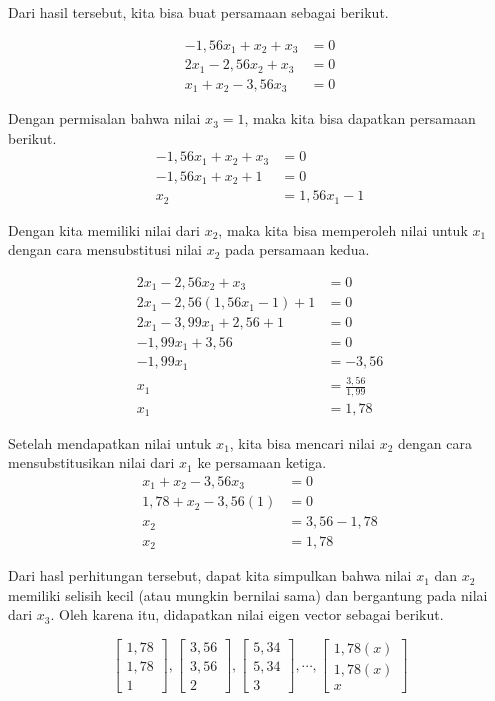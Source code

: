 \documentclass{article}
\begin{document}
\setcounter{equation}{0}

Dari hasil tersebut, kita bisa buat persamaan sebagai berikut.

\begin{align}
    -1,56x_1 + x_2 + x_3 &= 0\\
    2x_1 -2,56x_2 + x_3 &= 0\\
    x_1 + x_2 -3,56x_3 &= 0
\end{align}

Dengan permisalan bahwa nilai $x_3 = 1$, maka kita bisa dapatkan persamaan berikut.
\begin{align*}
-1,56x_1 + x_2 + x_3 &= 0\\
    -1,56x_1 + x_2 + 1 &= 0\\
    x_2 &= 1,56x_1 - 1
\end{align*}

Dengan kita memiliki nilai dari $x_2$, maka kita bisa memperoleh nilai untuk $x_1$ dengan cara mensubstitusi nilai $x_2$ pada persamaan kedua.

\begin{align*}
    2x_1 -2,56x_2 + x_3 &= 0\\
    2x_1 -2,56(1,56x_1 - 1) + 1 &= 0\\
    2x_1 -3,99x_1 + 2,56 + 1 &= 0\\
    -1,99x_1 + 3,56&= 0\\
    -1,99x_1 &= -3,56\\
    x_1 &= \frac{3,56}{1,99}\\
    x_1 &= 1,78
\end{align*}

Setelah mendapatkan nilai untuk $x_1$, kita bisa mencari nilai $x_2$ dengan cara mensubstitusikan nilai dari $x_1$ ke persamaan ketiga.
\begin{align*}
    x_1 + x_2 -3,56x_3 &= 0\\
    1,78 + x_2 -3,56(1) &= 0\\
    x_2 &= 3,56-1,78\\
    x_2 &= 1,78
\end{align*}

Dari hasl perhitungan tersebut, dapat kita simpulkan bahwa nilai $x_1$ dan $x_2$ memiliki selisih kecil (atau mungkin bernilai sama) dan bergantung pada nilai dari $x_3$. Oleh karena itu, didapatkan nilai eigen vector sebagai berikut.

$$
\begin{bmatrix}
    1,78\\
    1,78\\
    1
\end{bmatrix}
,
\begin{bmatrix}
    3,56\\
    3,56\\
    2
\end{bmatrix}
,
\begin{bmatrix}
    5,34\\
    5,34\\
    3
\end{bmatrix}
,
\cdots
,
\begin{bmatrix}
    1,78(x)\\
    1,78(x)\\
    x
\end{bmatrix}
$$
\end{document}
